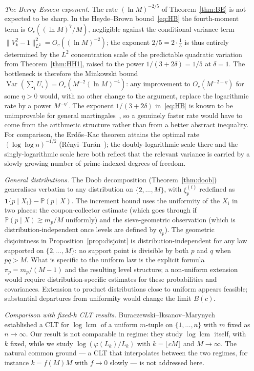 \documentclass[11pt]{article}
\theoremstyle{remark}
\newcommand{\lcm}{\operatorname{lcm}}
\newcommand{\PP}{\mathbb{P}}
\newcommand{\one}{\mathbf{1}}
\DeclareMathOperator{\Var}{Var}
\begin{document}
\emph{The Berry--Esseen exponent.} The rate $(\ln M)^{-2/5}$ of Theorem~\ref{thm:BE} is not expected to be sharp. In the Heyde--Brown bound~\eqref{eq:HB} the fourth-moment term is $O_c((\ln M)^7/M)$, negligible against the conditional-variance term $\|V_k^2 - 1\|_{L^2}^2 = O_c((\ln M)^{-2})$; the exponent $2/5 = 2 \cdot \tfrac15$ is thus entirely determined by the $L^2$ concentration scale of the predictable quadratic variation from Theorem~\ref{thm:HH1}, raised to the power $1/(3 + 2\delta) = 1/5$ at $\delta = 1$. The bottleneck is therefore the Minkowski bound $\Var(\sum_i U_i) = O_c(M^{-2}(\ln M)^{-4})$: any improvement to $O_c(M^{-2-\eta})$ for some $\eta > 0$ would, with no other change to the argument, replace the logarithmic rate by a power $M^{-\eta'}$. The exponent $1/(3+2\delta)$ in~\eqref{eq:HB} is known to be unimprovable for general martingales~\cite{Mourrat}, so a genuinely faster rate would have to come from the arithmetic structure rather than from a better abstract inequality. For comparison, the Erd\H{o}s--Kac theorem attains the optimal rate $(\log\log n)^{-1/2}$ (R\'enyi--Tur\'an~\cite{RenyiTuran}); the doubly-logarithmic scale there and the singly-logarithmic scale here both reflect that the relevant variance is carried by a slowly growing number of prime-indexed degrees of freedom.

\emph{General distributions.} The Doob decomposition (Theorem~\ref{thm:doob}) generalises verbatim to any distribution on $\{2, \ldots, M\}$, with $\xi_p^{(i)}$ redefined as $\one\{p \mid X_i\} - \PP(p \mid X)$. The increment bound uses the uniformity of the $X_i$ in two places: the coupon-collector estimate (which goes through if $\PP(p \mid X) \gtrsim m_p/M$ uniformly) and the sieve-geometric observation (which is distribution-independent once levels are defined by $q_p$). The geometric disjointness in Proposition~\ref{prop:disjoint} is distribution-independent for any law supported on $\{2,\ldots,M\}$: no support point is divisible by both $p$ and $q$ when $pq>M$. What is specific to the uniform law is the explicit formula $\pi_p=m_p/(M-1)$ and the resulting level structure; a non-uniform extension would require distribution-specific estimates for these probabilities and covariances. Extension to product distributions close to uniform appears feasible; substantial departures from uniformity would change the limit $B(c)$.

\emph{Comparison with fixed-$k$ CLT results.} Buraczewski--Iksanov--Marynych~\cite{BIM} established a CLT for $\log \lcm$ of a uniform $m$-tuple on $\{1, \ldots, n\}$ with $m$ fixed as $n \to \infty$. Our result is not comparable in regime: they study $\log \lcm$ itself, with $k$ fixed, while we study $\log(\varphi(L_k)/L_k)$ with $k = \lfloor cM \rfloor$ and $M \to \infty$. The natural common ground --- a CLT that interpolates between the two regimes, for instance $k = f(M) M$ with $f \to 0$ slowly --- is not addressed here.
\end{document}

